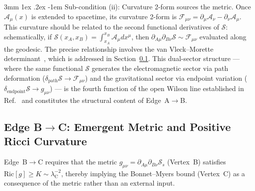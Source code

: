 \documentclass[%
 reprint, amsmath,amssymb, aps, prd, ]{revtex4-2}
\makeatletter
\numberwithin{equation}{section}
\renewcommand\paragraph{%
  \@startsection{paragraph}{4}{\z@}%
    {3mm \@plus 1ex \@minus .2ex}%
    {-1em}%
    {\normalfont\normalsize\itshape}}
\newcommand{\lambdaC}{\lambda_{\mathrm{C}}}
\newcommand{\BerryA}{\mathcal{A}}
\newcommand{\BerryF}{\mathcal{F}}
\newcommand{\SyngeS}{\mathcal{S}}
\makeatother
\begin{document}
\paragraph{Sub-condition (ii): Curvature 2-form sources the metric.}
Once $\BerryA_\mu(x)$ is extended to spacetime, its curvature 2-form is $\BerryF_{\mu\nu} = \partial_\mu \BerryA_\nu - \partial_\nu \BerryA_\mu$.
This curvature should be related to the second functional derivatives of $\SyngeS$: schematically, if $\SyngeS(x_A,x_B) = \int_{x_A}^{x_B} \BerryA_\mu dx^\mu$, then $\partial_{A\mu}\partial_{B\nu}\SyngeS \sim \BerryF_{\mu\nu}$ evaluated along the geodesic.
The precise relationship involves the van Vleck--Morette determinant~\cite{VanVleck1928,DeWitt1965}, which is addressed in Section~\ref{subsec:edgeII}.
This dual-sector structure --- where the same functional $\SyngeS$ generates the electromagnetic sector via path deformation ($\delta_\mathrm{path}\SyngeS \to \BerryF_{\mu\nu}$) and the gravitational sector via endpoint variation ($\delta_\mathrm{endpoint}\SyngeS \to g_{\mu\nu}$) --- is the fourth function of the open Wilson line established in Ref.~\cite{hanamura55} and constitutes the structural content of Edge~A$\to$B.

\subsection{Edge B$\to$C: Emergent Metric and Positive Ricci Curvature}
\label{subsec:edgeII}

Edge~B$\to$C requires that the metric $g_{\mu\nu} = \partial_{A\mu}\partial_{B\nu}\SyngeS_s$ (Vertex~B) satisfies $\mathrm{Ric}[g] \geq K \sim \lambdaC^{-2}$, thereby implying the Bonnet--Myers bound (Vertex~C) as a consequence of the metric rather than an external input.
\end{document}
